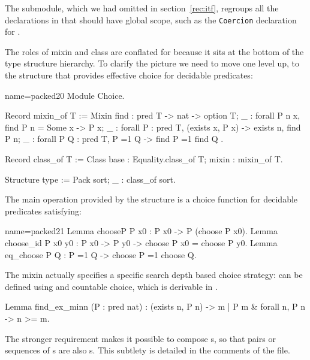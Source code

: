 The  submodule, which we had omitted in section~\ref{rec:itf},
regroups all the declarations in  that should have global scope,
such as the \lstinline/Coercion/ declaration for .

The roles of mixin and class are conflated for 
because it sits at the bottom of the type structure hierarchy. To
clarify the picture we need to move one level up, to the
 structure that provides effective choice for decidable
predicates:

\begin{coq}{name=packed20}{}
Module Choice.

Record mixin_of T := Mixin {
  find : pred T -> nat -> option T;
  _ : forall P n x, find P n = Some x -> P x;
  _ : forall P : pred T, (exists x, P x) -> exists n, find P n;
  _ : forall P Q : pred T, P =1 Q -> find P =1 find Q
}.

Record class_of T :=
  Class {base : Equality.class_of T; mixin : mixin_of T}.

Structure type := Pack {sort; _ : class_of sort}.
\end{coq}


The main operation provided by the  structure  is a
choice function for decidable predicates  satisfying:

\begin{coq}{name=packed21}{}
Lemma chooseP P x0 : P x0 -> P (choose P x0).
Lemma choose_id P x0 y0 : P x0 -> P y0 -> choose P x0 = choose P y0.
Lemma eq_choose P Q : P =1 Q -> choose P =1 choose Q.
\end{coq}

The mixin actually specifies a specific search depth based choice
strategy:  can be defined using  and countable
choice, which is derivable in \mcbCIC{}. 

\begin{coq}{}{}
Lemma find_ex_minn (P : pred nat)  :
  (exists n, P n) -> {m | P m & forall n, P n -> n >= m}.
\end{coq}
The stronger requirement
makes it possible to compose s, so that pairs or
sequences of s are also s.  This subtlety
is detailed in the comments of the  file.

